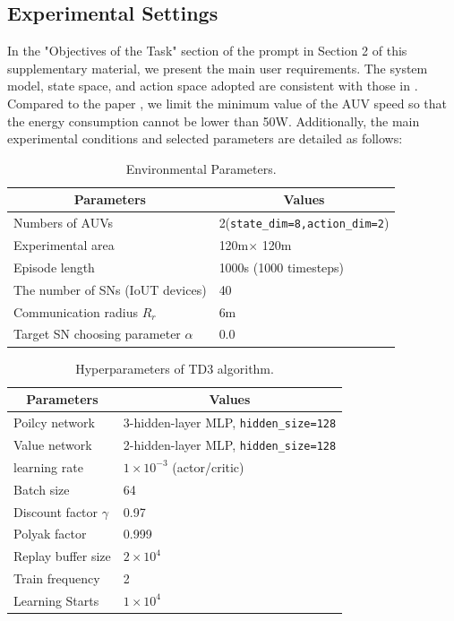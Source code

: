 \documentclass{article}
\begin{document}
\subsection{Experimental Settings}
In the "Objectives of the Task" section of the prompt in Section 2 of this supplementary material, we present the main user requirements. The system model, state space, and action space adopted are consistent with those in \cite{1}. Compared to the paper \cite{1}, we limit the minimum value of the AUV speed so that the energy consumption cannot be lower than 50W. Additionally, the main experimental conditions and selected parameters are detailed as follows:
\begin{table}[!ht]
    \centering
    \caption{Environmental Parameters.}
    \label{tab:3}
    \begin{tabular}{l|l}
    \hline
    \multicolumn{1}{c|}{Parameters} & \multicolumn{1}{c}{Values}\\
    \hline
    Numbers of AUVs & 2(\verb|state_dim=8,action_dim=2|) \\
    Experimental area & 120m$\times$ 120m \\
    Episode length & 1000s (1000 timesteps) \\
    The number of SNs (IoUT devices) & 40 \\
    Communication radius $R_r$ & 6m \\
    Target SN choosing parameter $\alpha$ & 0.0 \\
    \hline
    \end{tabular}
    \end{table}

    \begin{table}[!ht]
    \centering
    \caption{Hyperparameters of TD3 algorithm.}
    \label{tab:3}
    \begin{tabular}{l|l}
    \hline
    \multicolumn{1}{c|}{Parameters} & \multicolumn{1}{c}{Values}\\
    \hline
    Poilcy network & 3-hidden-layer MLP, \verb|hidden_size=128| \\
    Value network & 2-hidden-layer MLP, \verb|hidden_size=128| \\
    learning rate & $1\times 10^{-3}$ (actor/critic) \\
    Batch size & 64 \\
    Discount factor $\gamma$ & 0.97 \\
    Polyak factor & 0.999 \\
    Replay buffer size & $2\times 10^{4}$ \\
    Train frequency & 2 \\
    Learning Starts & $1\times 10^{4}$ \\
    \hline
    \end{tabular}
    \end{table}
\end{document}
